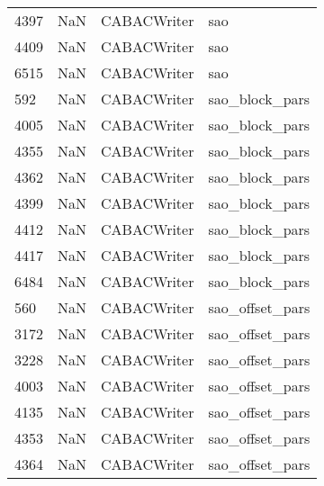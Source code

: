 \begin{tabular}{llll}
4397 &                   NaN &                CABACWriter &                                       sao \\
4409 &                   NaN &                CABACWriter &                                       sao \\
6515 &                   NaN &                CABACWriter &                                       sao \\
592  &                   NaN &                CABACWriter &                            sao\_block\_pars \\
4005 &                   NaN &                CABACWriter &                            sao\_block\_pars \\
4355 &                   NaN &                CABACWriter &                            sao\_block\_pars \\
4362 &                   NaN &                CABACWriter &                            sao\_block\_pars \\
4399 &                   NaN &                CABACWriter &                            sao\_block\_pars \\
4412 &                   NaN &                CABACWriter &                            sao\_block\_pars \\
4417 &                   NaN &                CABACWriter &                            sao\_block\_pars \\
6484 &                   NaN &                CABACWriter &                            sao\_block\_pars \\
560  &                   NaN &                CABACWriter &                           sao\_offset\_pars \\
3172 &                   NaN &                CABACWriter &                           sao\_offset\_pars \\
3228 &                   NaN &                CABACWriter &                           sao\_offset\_pars \\
4003 &                   NaN &                CABACWriter &                           sao\_offset\_pars \\
4135 &                   NaN &                CABACWriter &                           sao\_offset\_pars \\
4353 &                   NaN &                CABACWriter &                           sao\_offset\_pars \\
4364 &                   NaN &                CABACWriter &                           sao\_offset\_pars \\

\end{tabular}
